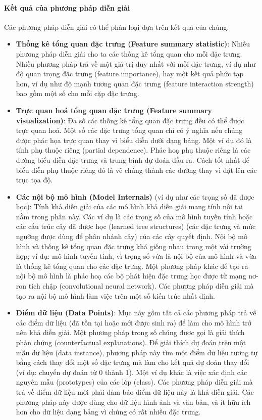 \paragraph{Kết quả của phương pháp diễn giải} Các phương pháp diễn giải có thể phân loại dựa trên kết quả của chúng.

\begin{itemize}
\item \textbf{Thống kê tổng quan đặc trưng (Feature summary statistic)}: Nhiều phương pháp diễn giải cho ta các thống kê tổng quan cho mỗi đặc trưng. Nhiều phương pháp trả về một giá trị duy nhất với mỗi đặc trưng, ví dụ như độ quan trọng đặc trưng (feature importance), hay một kết quả phức tạp hơn, ví dụ như độ mạnh tương quan đặc trưng (feature interaction strength) bao gồm một số cho mỗi cặp đặc trưng.

\item \textbf{Trực quan hoá tổng quan đặc trưng (Feature summary visualization)}: Đa số các thống kê tổng quan đặc trưng đều có thể được trực quan hoá. Một số các đặc trưng tổng quan chỉ có ý nghĩa nếu chúng được phác họa trực quan thay vì biểu diễn dưới dạng bảng. Một ví dụ đó là tính phụ thuộc riêng (partial dependence). Phác hoạ phụ thuộc riêng là các đường biểu diễn đặc trưng và trung bình dự đoán đầu ra. Cách tốt nhất để biểu diễn phụ thuộc riêng đó là vẽ chúng thành các đường thay vì đặt lên các trục tọa độ.

\item \textbf{Các nội bộ mô hình (Model Internals)} (ví dụ như các trọng số đã được học): Tính khả diễn giải của các mô hình khả diễn giải mang tính nội tại nằm trong phần này. Các ví dụ là các trọng số của mô hình tuyến tính hoặc các cấu trúc cây đã được học (learned tree structures) (các đặc trưng và mức ngưỡng được dùng để phân nhánh cây) của các cây quyết định. Nội bộ mô hình và thống kê tổng quan đặc trưng khá giống nhau trong một vài trường hợp; ví dụ: mô hình tuyến tính, vì trọng số vừa là nội bộ của mô hình và vừa là thống kê tổng quan cho các đặc trưng. Một phương pháp khác để tạo ra nội bộ mô hình là phác hoạ các bộ phát hiện đặc trưng học được từ mạng nơ-ron tích chập (convolutional neural network). Các phương pháp diễn giải mà tạo ra nội bộ mô hình làm việc trên một số kiến trúc nhất định.

\item \textbf{Điểm dữ liệu (Data Points)}: Mục này gồm tất cả các phương pháp trả về các điểm dữ liệu (đã tồn tại hoặc mới được sinh ra) để làm cho mô hình trở nên khả diễn giải. Một phương pháp trong số chúng được gọi là giải thích phản chứng (counterfactual explanations). Để giải thích dự đoán trên một mẫu dữ liệu (data instance), phương pháp này tìm một điểm dữ liệu tương tự bằng cách thay đổi một số đặc trưng mà làm cho kết quả dự đoán thay đổi (ví dụ: chuyển dự đoán từ 0 thành 1). Một ví dụ khác là việc xác định các nguyên mẫu (prototypes) của các lớp (class). Các phương pháp diễn giải mà trả về điểm dữ liệu mới phải đảm bảo điểm dữ liệu này là khả diễn giải. Các phương pháp này được dùng cho dữ liệu hình ảnh và văn bản, và ít hữu ích hơn cho dữ liệu dạng bảng vì chúng có rất nhiều đặc trưng.


\end{itemize}
